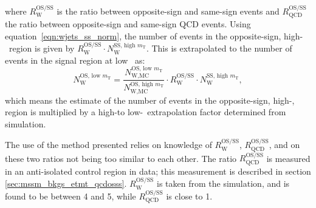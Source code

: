 where $R_{\text{W}}^{\text{OS/SS}}$ is the ratio between opposite-sign and same-sign \Wjets events
and $R_{\text{QCD}}^{\text{OS/SS}}$ the ratio between opposite-sign and same-sign QCD events. Using 
equation~\ref{eqn:wjets_ss_norm}, the number of \Wjets events in the
opposite-sign, high-\mT~region is given by $R_{\text{W}}^{\text{OS/SS}}\cdot N_{\text{W}}^{\text{SS, high } m_{\text{T}}}$. 
This is extrapolated to the number of \Wjets events in the signal region at low \mT~as:
\begin{equation}\label{eqn:wjets_os_norm}
N_{\text{W}}^{\text{OS, low } m_{\text{T}}} = \frac{N_{\text{W,MC}}^{\text{OS, low } m_{\text{T}}}}{N_{\text{W,MC}}^{\text{OS, high } m_{\text{T}}}}\cdot R_{\text{W}}^{\text{OS/SS}} \cdot N_{\text{W}}^{\text{SS, high }m_{\text{T}}},
\end{equation}
which means the estimate of the number of \Wjets events in the opposite-sign, high-\mT, region
is multiplied by a high-\mT to low-\mT~extrapolation factor determined from simulation.

The use of the method presented relies on knowledge of $R_{\text{W}}^{\text{OS/SS}}$,
$R_{\text{QCD}}^{\text{OS/SS}}$, and on these two ratios not being too similar to each other. 
The ratio $R_{\text{QCD}}^{\text{OS/SS}}$ is measured in an anti-isolated
control region in data; this measurement is described in section \ref{sec:mssm_bkgs_etmt_qcdosss}. $R_{\text{W}}^{\text{OS/SS}}$ is 
taken from the \Wjets simulation, and is found to be between 4 and 5, while $R_{\text{QCD}}^{\text{OS/SS}}$
is close to 1.

